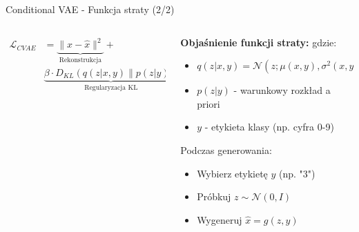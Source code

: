 \documentclass{beamer}
\begin{document}
\begin{frame}{Conditional VAE - Funkcja straty (2/2)}
  \begin{columns}
    \begin{column}{0.5\textwidth}
      \begin{tcolorbox}[colback=yellow!10!white, colframe=black!60, boxrule=0.5pt, arc=3mm]
        \begin{align*}
          \mathcal{L}_{CVAE} &= \underbrace{\|x - \hat{x}\|^2}_{\text{Rekonstrukcja}} + \\
          &\underbrace{\beta \cdot D_{KL}(q(z|x,y) \| p(z|y))}_{\text{Regularyzacja KL}}
        \end{align*}
      \end{tcolorbox}
    \end{column}
    \begin{column}{0.5\textwidth}
      \textbf{Objaśnienie funkcji straty:}
      \medskip
      gdzie:
      \begin{itemize}
        \item $q(z|x,y) = \mathcal{N}(z; \mu(x,y), \sigma^2(x,y))$
        \item $p(z|y)$ - warunkowy rozkład a priori
        \item $y$ - etykieta klasy (np. cyfra 0-9)
      \end{itemize}
      
      \medskip
      Podczas generowania:
      \begin{itemize}
        \item Wybierz etykietę $y$ (np. "3")
        \item Próbkuj $z \sim \mathcal{N}(0, I)$
        \item Wygeneruj $\hat{x} = g(z, y)$
      \end{itemize}
    \end{column}
  \end{columns}
\end{frame}
\end{document}
